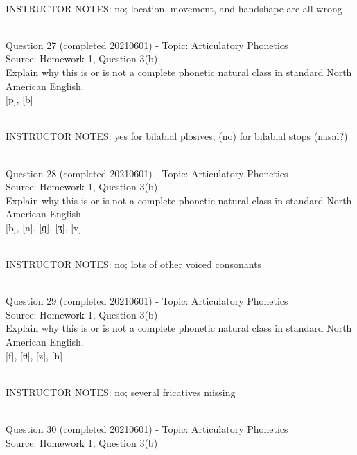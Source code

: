 \documentclass[12pt]{article}
\begin{document}
~\\
INSTRUCTOR NOTES: no; location, movement, and handshape are all wrong


~\\

{\large Question 27} (completed 20210601) - Topic: Articulatory Phonetics\\
Source: Homework 1, Question 3(b)\\

Explain why this is or is not a complete phonetic natural class in standard North American English.\\

{[p]}, {[b]}


~\\
INSTRUCTOR NOTES: yes for bilabial plosives; (no) for bilabial stops (nasal?)


~\\

{\large Question 28} (completed 20210601) - Topic: Articulatory Phonetics\\
Source: Homework 1, Question 3(b)\\

Explain why this is or is not a complete phonetic natural class in standard North American English.\\

{[b]}, {[n]}, {[ɡ]}, {[ʒ]}, {[v]}


~\\
INSTRUCTOR NOTES: no; lots of other voiced consonants


~\\

{\large Question 29} (completed 20210601) - Topic: Articulatory Phonetics\\
Source: Homework 1, Question 3(b)\\

Explain why this is or is not a complete phonetic natural class in standard North American English.\\

{[f]}, {[θ]}, {[z]}, {[h]}


~\\
INSTRUCTOR NOTES: no; several fricatives missing


~\\

{\large Question 30} (completed 20210601) - Topic: Articulatory Phonetics\\
Source: Homework 1, Question 3(b)\\
\end{document}
